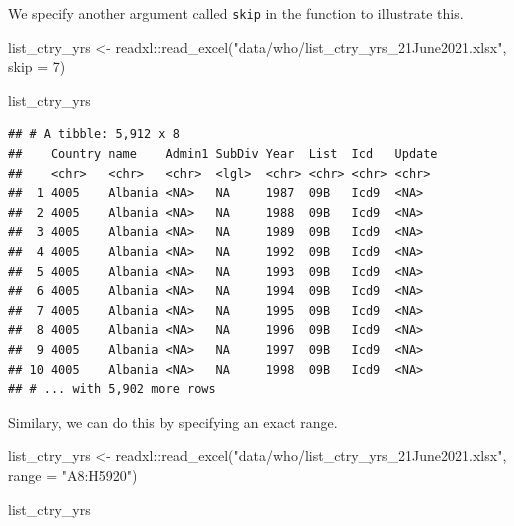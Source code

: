 \documentclass[
]{book}
\newenvironment{Shaded}{\begin{snugshade}}{\end{snugshade}}
\newcommand{\AttributeTok}[1]{\textcolor[rgb]{0.77,0.63,0.00}{#1}}
\newcommand{\DecValTok}[1]{\textcolor[rgb]{0.00,0.00,0.81}{#1}}
\newcommand{\FunctionTok}[1]{\textcolor[rgb]{0.00,0.00,0.00}{#1}}
\newcommand{\NormalTok}[1]{#1}
\newcommand{\OtherTok}[1]{\textcolor[rgb]{0.56,0.35,0.01}{#1}}
\newcommand{\SpecialCharTok}[1]{\textcolor[rgb]{0.00,0.00,0.00}{#1}}
\newcommand{\StringTok}[1]{\textcolor[rgb]{0.31,0.60,0.02}{#1}}
\begin{document}
We specify another argument called \texttt{skip} in the function to illustrate this.

\begin{Shaded}
\begin{Highlighting}[]
\NormalTok{list\_ctry\_yrs }\OtherTok{\textless{}{-}}\NormalTok{ readxl}\SpecialCharTok{::}\FunctionTok{read\_excel}\NormalTok{(}\StringTok{"data/who/list\_ctry\_yrs\_21June2021.xlsx"}\NormalTok{, }\AttributeTok{skip =} \DecValTok{7}\NormalTok{)}
\end{Highlighting}
\end{Shaded}

\begin{Shaded}
\begin{Highlighting}[]
\NormalTok{list\_ctry\_yrs}
\end{Highlighting}
\end{Shaded}

\begin{verbatim}
## # A tibble: 5,912 x 8
##    Country name    Admin1 SubDiv Year  List  Icd   Update
##    <chr>   <chr>   <chr>  <lgl>  <chr> <chr> <chr> <chr> 
##  1 4005    Albania <NA>   NA     1987  09B   Icd9  <NA>  
##  2 4005    Albania <NA>   NA     1988  09B   Icd9  <NA>  
##  3 4005    Albania <NA>   NA     1989  09B   Icd9  <NA>  
##  4 4005    Albania <NA>   NA     1992  09B   Icd9  <NA>  
##  5 4005    Albania <NA>   NA     1993  09B   Icd9  <NA>  
##  6 4005    Albania <NA>   NA     1994  09B   Icd9  <NA>  
##  7 4005    Albania <NA>   NA     1995  09B   Icd9  <NA>  
##  8 4005    Albania <NA>   NA     1996  09B   Icd9  <NA>  
##  9 4005    Albania <NA>   NA     1997  09B   Icd9  <NA>  
## 10 4005    Albania <NA>   NA     1998  09B   Icd9  <NA>  
## # ... with 5,902 more rows
\end{verbatim}

Similary, we can do this by specifying an exact range.

\begin{Shaded}
\begin{Highlighting}[]
\NormalTok{list\_ctry\_yrs }\OtherTok{\textless{}{-}}\NormalTok{ readxl}\SpecialCharTok{::}\FunctionTok{read\_excel}\NormalTok{(}\StringTok{"data/who/list\_ctry\_yrs\_21June2021.xlsx"}\NormalTok{, }
                                    \AttributeTok{range =} \StringTok{"A8:H5920"}\NormalTok{)}
\end{Highlighting}
\end{Shaded}

\begin{Shaded}
\begin{Highlighting}[]
\NormalTok{list\_ctry\_yrs}
\end{Highlighting}
\end{Shaded}
\end{document}
